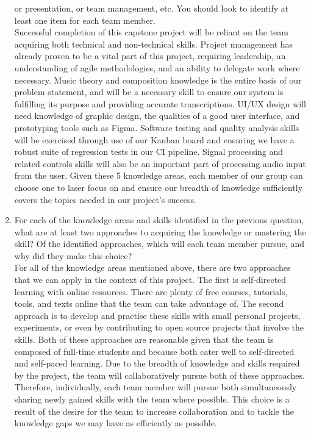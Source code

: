 \begin{enumerate}
  or presentation, or team management, etc.  You should look to identify at
  least one item for each team member. \\
  Successful completion of this capstone project will be reliant on the team acquiring both technical and non-technical skills. Project management has already proven to be a vital part of this project, requiring leadership, an understanding of agile methodologies, and an ability to delegate work where necessary. Music theory and composition knowledge is the entire basis of our problem statement, and will be a necessary skill to ensure our system is fulfilling its purpose and providing accurate transcriptions. UI/UX design will need knowledge of graphic design, the qualities of a good user interface, and prototyping tools such as Figma. Software testing and quality analysis skills will be exercised through use of our Kanban board and ensuring we have a robust suite of regression tests in our CI pipeline. Signal processing and related controls skills will also be an important part of processing audio input from the user. Given these 5 knowledge areas, each member of our group can choose one to laser focus on and ensure our breadth of knowledge sufficiently covers the topics needed in our project's success.\\
  \item For each of the knowledge areas and skills identified in the previous
  question, what are at least two approaches to acquiring the knowledge or
  mastering the skill?  Of the identified approaches, which will each team
  member pursue, and why did they make this choice? \\
  For all of the knowledge areas mentioned above, there are two approaches that we can apply in the context of this project. The first is self-directed learning with online resources. There are plenty of free courses, tutorials, tools, and texts online that the team can take advantage of. The second approach is to develop and practise these skills with small personal projects, experiments, or even by contributing to open source projects that involve the skills. Both of these approaches are reasonable given that the team is composed of full-time students and because both cater well to self-directed and self-paced learning. Due to the breadth of knowledge and skills required by the project, the team will collaboratively pursue both of these approaches. Therefore, individually, each team member will pursue both simultaneously sharing newly gained skills with the team where possible. This choice is a result of the desire for the team to increase collaboration and to tackle the knowledge gaps we may have as efficiently as possible. 
\end{enumerate}
